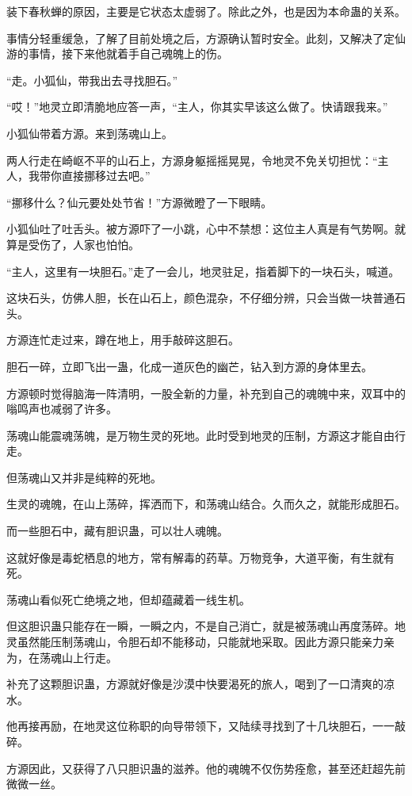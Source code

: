 \begin{this_body}
装下春秋蝉的原因，主要是它状态太虚弱了。除此之外，也是因为本命蛊的关系。

事情分轻重缓急，了解了目前处境之后，方源确认暂时安全。此刻，又解决了定仙游的事情，接下来他就着手自己魂魄上的伤。

“走。小狐仙，带我出去寻找胆石。”

“哎！”地灵立即清脆地应答一声，“主人，你其实早该这么做了。快请跟我来。”

小狐仙带着方源。来到荡魂山上。

两人行走在崎岖不平的山石上，方源身躯摇摇晃晃，令地灵不免关切担忧：“主人，我带你直接挪移过去吧。”

“挪移什么？仙元要处处节省！”方源微瞪了一下眼睛。

小狐仙吐了吐舌头。被方源吓了一小跳，心中不禁想：这位主人真是有气势啊。就算是受伤了，人家也怕怕。

“主人，这里有一块胆石。”走了一会儿，地灵驻足，指着脚下的一块石头，喊道。

这块石头，仿佛人胆，长在山石上，颜色混杂，不仔细分辨，只会当做一块普通石头。

方源连忙走过来，蹲在地上，用手敲碎这胆石。

胆石一碎，立即飞出一蛊，化成一道灰色的幽芒，钻入到方源的身体里去。

方源顿时觉得脑海一阵清明，一股全新的力量，补充到自己的魂魄中来，双耳中的嗡鸣声也减弱了许多。

荡魂山能震魂荡魄，是万物生灵的死地。此时受到地灵的压制，方源这才能自由行走。

但荡魂山又并非是纯粹的死地。

生灵的魂魄，在山上荡碎，挥洒而下，和荡魂山结合。久而久之，就能形成胆石。

而一些胆石中，藏有胆识蛊，可以壮人魂魄。

这就好像是毒蛇栖息的地方，常有解毒的药草。万物竞争，大道平衡，有生就有死。

荡魂山看似死亡绝境之地，但却蕴藏着一线生机。

但这胆识蛊只能存在一瞬，一瞬之内，不是自己消亡，就是被荡魂山再度荡碎。地灵虽然能压制荡魂山，令胆石却不能移动，只能就地采取。因此方源只能亲力亲为，在荡魂山上行走。

补充了这颗胆识蛊，方源就好像是沙漠中快要渴死的旅人，喝到了一口清爽的凉水。

他再接再励，在地灵这位称职的向导带领下，又陆续寻找到了十几块胆石，一一敲碎。

方源因此，又获得了八只胆识蛊的滋养。他的魂魄不仅伤势痊愈，甚至还赶超先前微微一丝。


\end{this_body}
